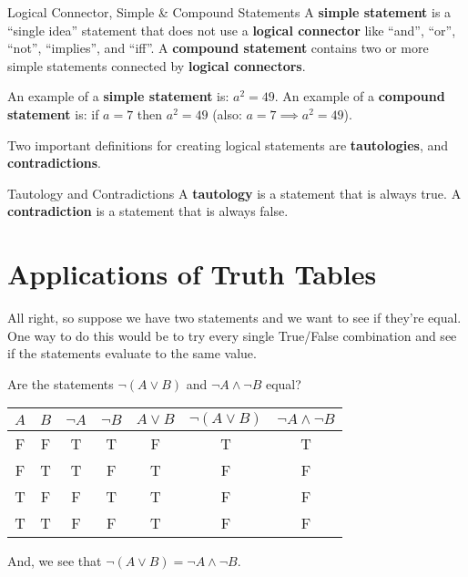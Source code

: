 \begin{boxdefine}{Logical Connector, Simple \& Compound Statements}{}
	A {\bf simple statement} is a ``single idea'' statement that does not use a {\bf logical connector} like ``and'', ``or'', ``not'', ``implies'', and ``iff''.
	A {\bf compound statement} contains two or more simple statements connected by {\bf logical connectors}.
\end{boxdefine}

\begin{boxexample}{}{}
	An example of a {\bf simple statement} is: $a^2=49$. An example of a {\bf compound statement} is: if $a=7$ then $a^2=49$ (also: $a=7 \implies a^2=49$). 
\end{boxexample}

Two important definitions for creating logical statements are {\bf tautologies}, and {\bf contradictions}.

\begin{boxdefine}{Tautology and Contradictions}{}
	A {\bf tautology} is a statement that is always true. A {\bf contradiction} is a statement that is always false.
\end{boxdefine}

\section{Applications of Truth Tables}

All right, so suppose we have two statements and we want to see if they're equal. One way to do this would be to try every single True/False combination and see if the statements evaluate to the same value.

\begin{boxexample}{}{}
	Are the statements $\neg (A \lor B)$ and $\neg A \land \neg B$ equal?

	\medskip
	\begin{tabular}{g|g|c|c|c|g|g}
		\hline
		$A$ & $B$ & $\neg A$ & $\neg B$ & $A \lor B$ & $\neg (A \lor B)$ & $\neg A \land \neg B$\\
		\hline
		F & F & T & T & F & T & T\\
		F & T & T & F & T & F & F\\
		T & F & F & T & T & F & F\\
		T & T & F & F & T & F & F\\
		\hline
	\end{tabular}
	\medskip

	And, we see that $\neg (A \lor B) = \neg A \land \neg B$.
\end{boxexample}

